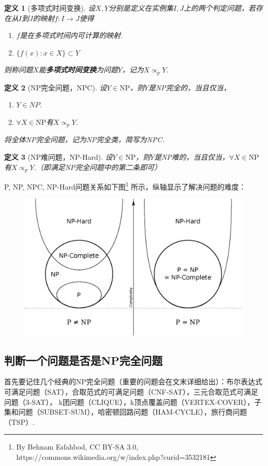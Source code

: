 \documentclass[12pt, a4paper, oneside]{ctexart}
\newtheorem{definition}{定义}[section]
\numberwithin{equation}{section}  %
\theoremstyle{definition}
\begin{document}
\begin{definition}[多项式时间变换]
    设$X,Y$分别是定义在实例集$I,J$上的两个判定问题，若存在从$I$到$J$的映射$f:I\to J$使得
    \begin{enumerate}
        \item $f$是在多项式时间内可计算的映射.
        \item $\{f(x):x\in X\} \subset Y$
    \end{enumerate}
    则称问题$X$能\textbf{多项式时间变换}为问题$Y$，记为$X\propto_p Y$.
\end{definition}
\begin{definition}[NP完全问题，NPC]
    设$Y\in \text{NP}$，则$Y$是NP完全的，当且仅当，
    \begin{enumerate}
        \item $Y\in NP$.
        \item $\forall X\in \text{NP}$有$X\propto_p Y$.
    \end{enumerate}
    将全体NP完全问题，记为NP完全类，简写为NPC.
\end{definition}
\begin{definition}[NP难问题，NP-Hard]
    设$Y\in \text{NP}$，则$Y$是NP难的，当且仅当，$\forall X\in \text{NP}$有$X\propto_p Y$.（即满足NP完全问题中的第二条即可）
\end{definition}
P, NP, NPC, NP-Hard问题关系如下图\footnote{By Behnam Esfahbod, CC BY-SA 3.0, https://commons.wikimedia.org/w/index.php?curid=3532181}
所示，纵轴显示了解决问题的难度：
\begin{figure}[htbp]
    \centering
    \includegraphics[scale=0.5]{P_np_np-complete_np-hard.eps}
\end{figure}

\subsection{判断一个问题是否是NP完全问题}
首先要记住几个经典的NP完全问题（重要的问题会在文末详细给出）：布尔表达式可满足问题（SAT），合取范式的可满足问题（CNF-SAT），三元合取范式可满足问题（3-SAT），
k团问题（CLIQUE），k顶点覆盖问题（VERTEX-COVER），子集和问题（SUBSET-SUM），哈密顿回路问题（HAM-CYCLE），旅行商问题（TSP）.
\end{document}
